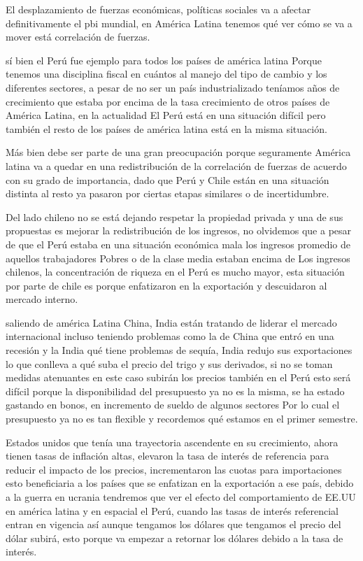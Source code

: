 \documentclass[
  a4paper,
]{article}
\begin{document}
El desplazamiento de fuerzas económicas, políticas sociales va a afectar
definitivamente el pbi mundial, en América Latina tenemos qué ver cómo
se va a mover está correlación de fuerzas.

sí bien el Perú fue ejemplo para todos los países de américa latina
Porque tenemos una disciplina fiscal en cuántos al manejo del tipo de
cambio y los diferentes sectores, a pesar de no ser un país
industrializado teníamos años de crecimiento que estaba por encima de la
tasa crecimiento de otros países de América Latina, en la actualidad El
Perú está en una situación difícil pero también el resto de los países
de américa latina está en la misma situación.

Más bien debe ser parte de una gran preocupación porque seguramente
América latina va a quedar en una redistribución de la correlación de
fuerzas de acuerdo con su grado de importancia, dado que Perú y Chile
están en una situación distinta al resto ya pasaron por ciertas etapas
similares o de incertidumbre.

Del lado chileno no se está dejando respetar la propiedad privada y una
de sus propuestas es mejorar la redistribución de los ingresos, no
olvidemos que a pesar de que el Perú estaba en una situación económica
mala los ingresos promedio de aquellos trabajadores Pobres o de la clase
media estaban encima de Los ingresos chilenos, la concentración de
riqueza en el Perú es mucho mayor, esta situación por parte de chile es
porque enfatizaron en la exportación y descuidaron al mercado interno.

saliendo de américa Latina China, India están tratando de liderar el
mercado internacional incluso teniendo problemas como la de China que
entró en una recesión y la India qué tiene problemas de sequía, India
redujo sus exportaciones lo que conlleva a qué suba el precio del trigo
y sus derivados, si no se toman medidas atenuantes en este caso subirán
los precios también en el Perú esto será difícil porque la
disponibilidad del presupuesto ya no es la misma, se ha estado gastando
en bonos, en incremento de sueldo de algunos sectores Por lo cual el
presupuesto ya no es tan flexible y recordemos qué estamos en el primer
semestre.

Estados unidos que tenía una trayectoria ascendente en su crecimiento,
ahora tienen tasas de inflación altas, elevaron la tasa de interés de
referencia para reducir el impacto de los precios, incrementaron las
cuotas para importaciones esto beneficiaria a los países que se
enfatizan en la exportación a ese país, debido a la guerra en ucrania
tendremos que ver el efecto del comportamiento de EE.UU en américa
latina y en espacial el Perú, cuando las tasas de interés referencial
entran en vigencia así aunque tengamos los dólares que tengamos el
precio del dólar subirá, esto porque va empezar a retornar los dólares
debido a la tasa de interés.
\end{document}
